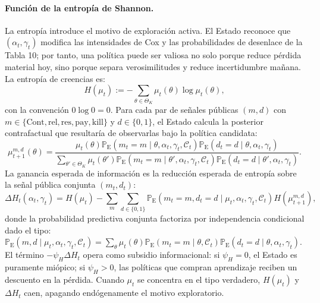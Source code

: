\documentclass[12pt]{article}
\theoremstyle{definition}
\theoremstyle{remark}
\newcommand{\ProbE}{\mathbb{P}_{\mathrm{E}}}
\newcommand{\1}{\mathbf{1}}
\begin{document}
\paragraph{Función de la entropía de Shannon.}
La entropía introduce el motivo de exploración activa. El Estado reconoce que $(\alpha_t,\gamma_t)$ modifica las intensidades de Cox y las probabilidades de desenlace de la Tabla 10; por tanto, una política puede ser valiosa no solo porque reduce pérdida material hoy, sino porque separa verosimilitudes y reduce incertidumbre mañana. La entropía de creencias es:
\begin{equation}
\label{eq:belief-entropy}
H(\mu_t)
:=
-\sum_{\theta\in\Theta_K}\mu_t(\theta)\log\mu_t(\theta),
\end{equation}
con la convención $0\log0=0$. Para cada par de señales públicas $(m,d)$ con $m\in\{\mathrm{Cont},\mathrm{rel},\mathrm{res},\mathrm{pay},\mathrm{kill}\}$ y $d\in\{0,1\}$, el Estado calcula la posterior contrafactual que resultaría de observarlas bajo la política candidata:
\begin{equation}
\label{eq:posterior-counterfactual-entropy}
\mu_{t+1}^{m,d}(\theta)
=
\frac{
\mu_t(\theta)\ProbE(m_t=m\mid\theta,\alpha_t,\gamma_t,\mathcal C_t)\ProbE(d_t=d\mid\theta,\alpha_t,\gamma_t)
}{
\sum_{\theta'\in\Theta_K}
\mu_t(\theta')\ProbE(m_t=m\mid\theta',\alpha_t,\gamma_t,\mathcal C_t)\ProbE(d_t=d\mid\theta',\alpha_t,\gamma_t)
}.
\end{equation}
La ganancia esperada de información es la reducción esperada de entropía sobre la señal pública conjunta $(m_t,d_t)$:
\begin{equation}
\label{eq:expected-information-gain}
\Delta H_t(\alpha_t,\gamma_t)
=
H(\mu_t)
-
\sum_{m}\sum_{d\in\{0,1\}}
\ProbE(m_t=m,d_t=d\mid\mu_t,\alpha_t,\gamma_t,\mathcal C_t)
H(\mu_{t+1}^{m,d}),
\end{equation}
donde la probabilidad predictiva conjunta factoriza por independencia condicional dado el tipo: $\ProbE(m,d\mid\mu_t,\alpha_t,\gamma_t,\mathcal C_t)=\sum_{\theta}\mu_t(\theta)\ProbE(m_t=m\mid\theta,\mathcal C_t)\ProbE(d_t=d\mid\theta,\alpha_t,\gamma_t)$. El término $-\psi_H\Delta H_t$ opera como subsidio informacional: si $\psi_H=0$, el Estado es puramente miópico; si $\psi_H>0$, las políticas que compran aprendizaje reciben un descuento en la pérdida. Cuando $\mu_t$ se concentra en el tipo verdadero, $H(\mu_t)$ y $\Delta H_t$ caen, apagando endógenamente el motivo exploratorio.
\end{document}
